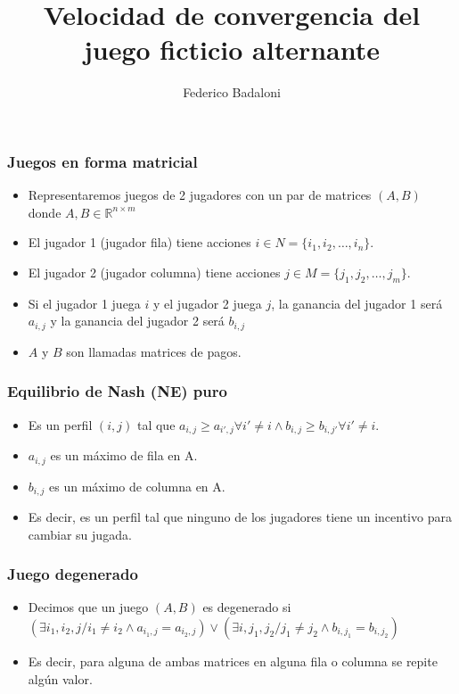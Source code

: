 \documentclass[handout, pdf]{beamer}
\title{Velocidad de convergencia del juego ficticio alternante}
\author[]{Federico Badaloni}
\begin{document}
\begin{frame}
    \frametitle{Juegos en forma matricial}
        \begin{itemize}
            \item Representaremos juegos de 2 jugadores con un par de matrices $(A, B)$ donde $A, B \in \mathbb{R}^{n \times m} $
            
            \pause
            \item El jugador 1 (jugador fila) tiene acciones $i \in N = \{i_1, i_2, \dots, i_n\}$.
            \pause
            \item El jugador 2 (jugador columna) tiene acciones $j \in M = \{j_1, j_2, \dots, j_m\}$.
            \pause
            \item Si el jugador 1 juega $i$ y el jugador 2 juega $j$, la ganancia del jugador 1 será $a_{i,j}$ y la ganancia del jugador 2 será $b_{i,j}$
            \pause
            \item $A$ y $B$ son llamadas matrices de pagos.
        \end{itemize}
\end{frame}

\begin{frame}
    \frametitle{Equilibrio de Nash (NE) puro}
        \begin{itemize}
        \item Es un perfil $(i, j)$ tal que $a_{i,j} \geq a_{i', j} \forall{i' \neq i} \land b_{i,j} \geq b_{i, j'} \forall{i' \neq i}$.
        \pause
        \item $a_{i, j}$ es un máximo de fila en A.
        \pause
        \item $b_{i, j}$ es un máximo de columna en A.
        \pause
        \item Es decir, es un perfil tal que ninguno de los jugadores tiene un incentivo para cambiar su jugada.
        \end{itemize}
\end{frame}

\begin{frame}
    \frametitle{Juego degenerado}
        \begin{itemize}
        \item Decimos que un juego $(A, B)$ es degenerado si $(\exists i_1, i_2,j / i_1 \neq i_2 \land a_{{i_1}, j} = a_{{i_2}, j}) \lor (\exists i, j_1, j_2/ j_1 \neq j_2 \land b_{i, {j_1}} = b_{i, {j_2}})$ 
        \item Es decir, para alguna de ambas matrices en alguna fila o columna se repite algún valor.
        \end{itemize}
\end{frame}
\end{document}
